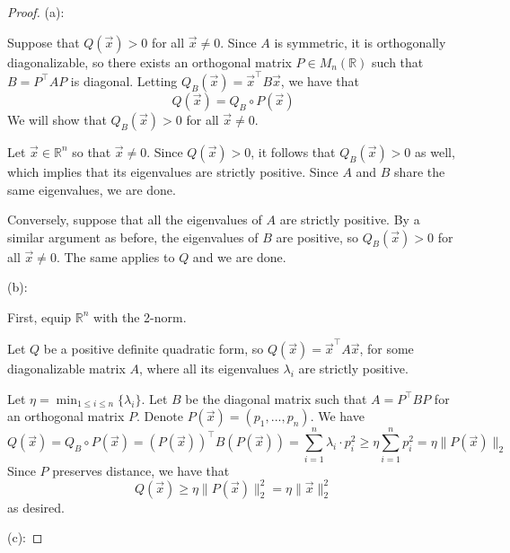 \documentclass{article}
\theoremstyle{plain} %
\numberwithin{thm}{section} %
\theoremstyle{definition}
\begin{document}
		\begin{proof}
            (a):

            Suppose that \(Q(\vec{x}) > 0\) for all \(\vec{x} \neq 0\). Since \(A\) is symmetric, it is orthogonally diagonalizable, so there exists an orthogonal matrix \(P \in M_n(\mathbb{R})\) such that \(B = P^{\top} A P\) is diagonal. Letting \(Q_B(\vec{x}) = \vec{x}^{\top} B \vec{x}\), we have that
            \[
                Q(\vec{x}) = Q_B \circ P (\vec{x})
            \]
            We will show that \(Q_B(\vec{x}) > 0\) for all \(\vec{x} \neq 0\).
    
            Let \(\vec{x} \in \mathbb{R}^n\) so that \(\vec{x} \neq 0\). Since \(Q(\vec{x}) > 0\), it follows that \(Q_B(\vec{x}) > 0\) as well, which implies that its eigenvalues are strictly positive. Since \(A\) and \(B\) share the same eigenvalues, we are done.
    
            Conversely, suppose that all the eigenvalues of \(A\) are strictly positive. By a similar argument as before, the eigenvalues of \(B\) are positive, so \(Q_B(\vec{x}) > 0\) for all \(\vec{x} \neq 0\). The same applies to \(Q\) and we are done.
    
            \medskip
    
            (b):
    
            First, equip \(\mathbb{R}^n\) with the 2-norm.
    
            Let \(Q\) be a positive definite quadratic form, so \(Q(\vec{x}) = \vec{x}^{\top}A\vec{x}\), for some diagonalizable matrix \(A\), where all its eigenvalues \(\lambda _i\) are strictly positive.
            
            Let \(\eta = \min_{1 \leq i \leq n} \{\lambda _i\}\). Let \(B\) be the diagonal matrix such that \(A = P^{\top} B P\) for an orthogonal matrix \(P\). Denote \(P(\vec{x}) = (p_1, ..., p_n)\). We have
            \[
                Q(\vec{x}) = Q_B \circ P(\vec{x}) = (P(\vec{x}))^{\top}B(P(\vec{x})) = \sum_{i=1}^{n} \lambda_i \cdot p_i^2 \geq \eta \sum_{i=1}^{n} p_i^2 = \eta \lVert P(\vec{x}) \rVert _2
            \]
            Since \(P\) preserves distance, we have that
            \[
                Q(\vec{x}) \geq \eta \lVert P(\vec{x}) \rVert _2^2 = \eta \lVert \vec{x} \rVert _2^2
            \]
            as desired.
    
            \medskip
    
            (c):
    

\end{proof}
\end{document}
